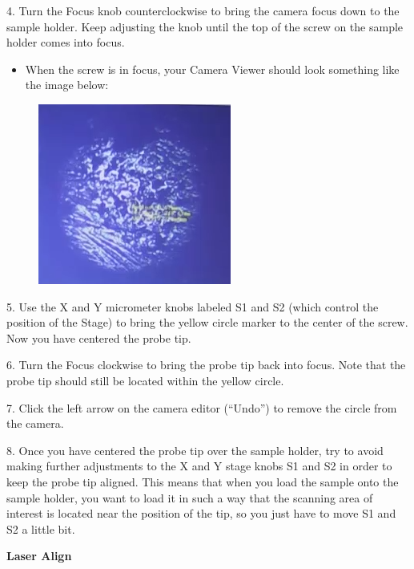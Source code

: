 \documentclass{../lab}
\begin{document}
4.  Turn the Focus knob counterclockwise to bring the camera focus down to the sample holder.  Keep adjusting the knob until the top of the screw on the sample holder comes into focus.

\begin{itemize}
    \item When the screw is in focus, your Camera Viewer should look something like the image below:

\end{itemize}

\begin{figure}[h]
    \centering
    \href{http://dev-physicsadv.pantheon.berkeley.edu/sites/default/files/AFMImages/sampleholder.PNG}{\includegraphics[width=0.5\linewidth]{images/sampleholder.PNG}}
    \caption{}
    \label{fig:sampleholder}
\end{figure}

5.  Use the X and Y micrometer knobs labeled S1 and S2 (which control the position of the Stage) to bring the yellow circle marker to the center of the screw.  Now you have centered the probe tip.

6.  Turn the Focus clockwise to bring the probe tip back into focus.  Note that the probe tip should still be located within the yellow circle.

7.  Click the left arrow on the camera editor (``Undo'') to remove the circle from the camera.

8.  Once you have centered the probe tip over the sample holder, try to avoid making further adjustments to the X and Y stage knobs S1 and S2 in order to keep the probe tip aligned.  This means that when you load the sample onto the sample holder, you want to load it in such a way that the scanning area of interest is located near the position of the tip, so you just have to move S1 and S2 a little bit.

\textbf{Laser Align}
\end{document}

